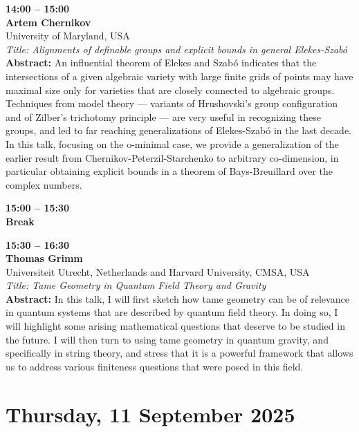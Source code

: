 \documentclass[10pt,a4paper]{article}
\begin{document}
\begin{tcolorbox}[talkbox]
\textbf{14:00 -- 15:00} \\
\textbf{Artem Chernikov} \\
University of Maryland, USA \\
\textit{Title: Alignments of definable groups and explicit bounds in general Elekes-Szabó} \\
\textbf{Abstract:} An influential theorem of Elekes and Szabó indicates that the intersections of a given algebraic variety with large finite grids of points may have maximal size only for varieties that are closely connected to algebraic groups.  Techniques from model theory --- variants of Hrushovski's group configuration and of Zilber's trichotomy principle --- are very useful in recognizing these groups, and led to far reaching generalizations of Elekes-Szabó in the last decade. In this talk, focusing on the o-minimal case, we provide a generalization of the earlier result from Chernikov-Peterzil-Starchenko to arbitrary co-dimension, in particular obtaining explicit bounds in a theorem of Bays-Breuillard over the complex numbers.
\end{tcolorbox}
\begin{tcolorbox}[talkbox]
\textbf{15:00 -- 15:30} \\
\textbf{Break}
\end{tcolorbox}
\begin{tcolorbox}[talkbox]
\textbf{15:30 -- 16:30} \\
\textbf{Thomas Grimm} \\
Universiteit Utrecht, Netherlands and Harvard University, CMSA, USA \\
\textit{Title: Tame Geometry in Quantum Field Theory and Gravity} \\
\textbf{Abstract:} In this talk, I will first sketch how tame geometry can be of relevance in quantum systems that are described by quantum field theory. In doing so, I will highlight some arising mathematical questions that deserve to be studied in the future. I will then turn to using tame geometry in quantum gravity, and specifically in string theory, and stress that it is a powerful framework that allows us to address various finiteness questions that were posed in this field. 
\end{tcolorbox}

\newpage

\section{Thursday, 11 September 2025}
\end{document}
